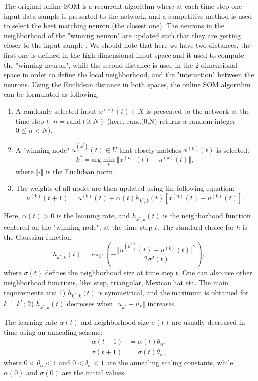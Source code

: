 \documentclass[10pt,english]{article}
\begin{document}
The original online SOM is a recurrent algorithm where at each time step one input data sample is presented to the network, and a competitive method is used 
to select the best matching neuron (the closest one). The neurons in the neighborhood of the "winning neuron" are updated such that they are getting closer to the input sample \cite{key-5}. 
We should note that here we have two distances, the first one is defined in the high-dimensional input space and it used to compute the "winning neuron", while the second distance is used in the 2-dimensional space in order to   
define the local neighborhood, and the "interaction" between the neurons. Using the Euclidean distance in both spaces, the online SOM algorithm can be formulated as following:
\begin{enumerate}
\item A randomly selected input $x^{(n)}(t) \in X$ is presented to the network at the time step $t$: $n=\text{rand}(0,N)$ (here, $\text{rand(0,N)}$ returns a random integer $0\leq n <N $).
\item A "winning node" $u^{(k^*)}(t) \in U$ that closely matches $x^{(n)}(t)$ is selected:
\begin{equation}
k^* = \text{arg} \min_k \Vert x^{(n)}(t) - u^{(k)}(t) \Vert, 
\end{equation}
where $\Vert \cdot \Vert$ is the Euclidean norm.
\item The weights of all nodes are then updated using the following equation:
\begin{equation}
u^{(k)}(t+1) = u^{(k)}(t) + \alpha(t) h_{k^*,k}(t)[x^{(n)}(t)-u^{(k)}(t)].
\end{equation}
\end{enumerate}
Here, $\alpha(t)>0$ is the learning rate, and $h_{k^*,k}(t)$ is the neighborhood function centered on the "winning node", at the time step $t$. 
The standard choice for $h$ is the Gaussian function:
\begin{equation}
h_{k^*,k}(t) = \exp \left( -\frac{\Vert u^{(k^*)}(t) - u^{(k)}(t) \Vert^2}{2\sigma^2(t)} \right), 
\end{equation}
where $\sigma(t)$ defines the neighborhood size at time step $t$. One can also use other neighborhood functions, like: step, triangular, Mexican hat etc. 
The main requirements are: 1) $h_{k^*,k}(t)$ is symmetrical, and the maximum is obtained for $k=k^*$; 2) $h_{k^*,k}(t)$ decreases when $\Vert u_{k^*} -u_k \Vert$ increases. 

The learning rate $\alpha(t)$ and neighborhood size $\sigma(t)$ are usually decreased in time using an annealing scheme:
\begin{align}
\alpha(t+1) &= \alpha(t) \theta_{\alpha}, \\
\sigma(t+1) &= \sigma(t) \theta_{\sigma}, 
\end{align}
where $0<\theta_{\alpha}<1$ and $0<\theta_{\sigma}<1$ are the annealing scaling constants, while $\alpha(0)$ and $\sigma(0)$ are the initial values.
 
\end{document}
